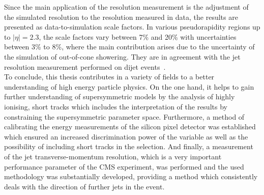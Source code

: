 Since the main application of the resolution measurement is the adjustment of the simulated resolution to the resolution measured in data, the results are presented as data-to-simulation scale factors.
In various pseudorapidity regions up to $|\eta|=2.3$, the scale factors vary between 7\% and 20\% with uncertainties between 3\% to 8\%, where the main contribution arises due to the uncertainty of the simulation of out-of-cone showering.
They are in agreement with the jet \pt resolution measurement performed on dijet events~\cite{bib:Kristin_Thesis}.\\

To conclude, this thesis contributes in a variety of fields to a better understanding of high energy particle physics.
On the one hand, it helps to gain further understanding of supersymmetric models by the analysis of highly ionising, short tracks which includes the interpretation of the results by constraining the supersymmetric parameter space.
Furthermore, a method of calibrating the energy measurements of the silicon pixel detector was established which ensured an increased discrimination power of the variable \dedx as well as the possibility of including short tracks in the selection.
And finally, a measurement of the jet transverse-momentum resolution, which is a very important performance parameter of the CMS experiment, was performed and the used methodology was substantially developed, providing a method which consistently deals with the direction of further jets in the event.



